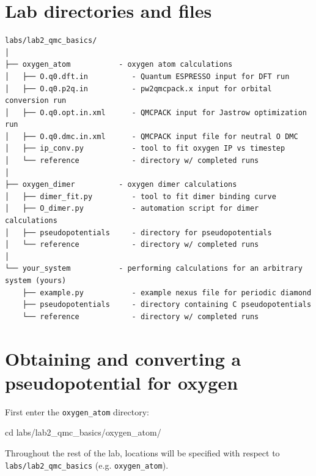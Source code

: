 \section{Lab directories and files}

\footnotesize
\begin{verbatim}
labs/lab2_qmc_basics/
│
├── oxygen_atom           - oxygen atom calculations 
│   ├── O.q0.dft.in          - Quantum ESPRESSO input for DFT run
│   ├── O.q0.p2q.in          - pw2qmcpack.x input for orbital conversion run
│   ├── O.q0.opt.in.xml      - QMCPACK input for Jastrow optimization run
│   ├── O.q0.dmc.in.xml      - QMCPACK input file for neutral O DMC
│   ├── ip_conv.py           - tool to fit oxygen IP vs timestep
│   └── reference            - directory w/ completed runs
│
├── oxygen_dimer          - oxygen dimer calculations
│   ├── dimer_fit.py         - tool to fit dimer binding curve
│   ├── O_dimer.py           - automation script for dimer calculations
│   ├── pseudopotentials     - directory for pseudopotentials
│   └── reference            - directory w/ completed runs
│
└── your_system           - performing calculations for an arbitrary system (yours)
    ├── example.py           - example nexus file for periodic diamond
    ├── pseudopotentials     - directory containing C pseudopotentials
    └── reference            - directory w/ completed runs
\end{verbatim}
\normalsize

\section{Obtaining and converting a pseudopotential for oxygen}
\label{sec:lqb_pseudo}
First enter the \texttt{oxygen\_atom} directory:
\begin{shade}
cd labs/lab2_qmc_basics/oxygen_atom/
\end{shade}
\noindent
Throughout the rest of the lab, locations will be specified with respect to \texttt{labs/lab2\_qmc\_basics} (e.g. \texttt{oxygen\_atom}).

